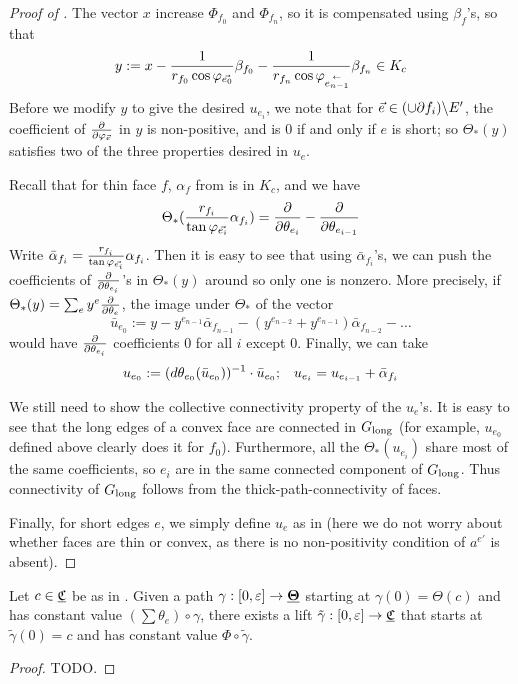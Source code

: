\begin{proof}[Proof of ]
The vector $x$ increase $\Phi_{f_0}$ and $\Phi_{f_n}$, so it is compensated
using $\beta_f$'s, so that
\[
y := x - \frac{1}{r_{f_0} \cos \varphi_{\vec{e_0}}} \beta_{f_0}
- \frac{1}{r_{f_n} \cos \varphi_{\overset{\leftarrow}{e_{n-1}}}} \beta_{f_n}
\in K_c
\]
Before we modify $y$ to give the desired $u_{e_i}$,
we note that for $\vec{e} \in (\cup \partial f_i) \backslash E'$,
the coefficient of ${\frac{\partial}{\partial \varphi_{\vec{e}}}}$ in $y$ is non-positive,
and is 0 if and only if $e$ is short;
so $\Theta_*(y)$ satisfies two of the three properties
desired in $u_e$.


Recall that for thin face $f$,
$\alpha_f$ from  is in $K_c$,
and we have
\[
\Theta_*(\frac{r_{f_i}}{\tan \varphi_{\vec{e_i}}} \alpha_{f_i}) = 
	{\frac{\partial}{\partial \theta_{e_i}}} - {\frac{\partial}{\partial \theta_{e_{i-1}}}}
\]
Write $\bar{\alpha}_{f_i} = \frac{r_{f_i}}{\tan \varphi_{\vec{e_i}}} \alpha_{f_i}$.
Then it is easy to see that using $\bar{\alpha}_{f_i}$'s, we can
push the coefficients of ${\frac{\partial}{\partial \theta_{e_i}}}$'s in $\Theta_*(y)$ around
so only one is nonzero.
More precisely, if
$\Theta_*(y) = \sum_e y^e {\frac{\partial}{\partial \theta_e}}$, the image under $\Theta_*$
of the vector
\[
\bar{u}_{e_0} := y - y^{e_{n-1}} \bar{\alpha}_{f_{n-1}}
- (y^{e_{n-2}} + y^{e_{n-1}}) \bar{\alpha}_{f_{n-2}}
- \ldots
\]
would have ${\frac{\partial}{\partial \theta_{e_i}}}$ coefficients 0 for all $i$ except 0.
Finally, we can take
\[
u_{e_0} := (d\theta_{e_0}(\bar{u}_{e_0}))^{-1} \cdot \bar{u}_{e_0};
\;\;\;
u_{e_i} = u_{e_{i-1}} + \bar{\alpha}_{f_i}
\]

We still need to show the collective connectivity property of the $u_e$'s.
It is easy to see that the long edges of a convex face
are connected in $G_{\text{long}}$
(for example, $u_{e_0}$ defined above clearly does it for
$f_0$).
Furthermore, all the $\Theta_*(u_{e_i})$ share most of the same coefficients,
so $e_i$ are in the same connected component of $G_{\text{long}}$.
Thus connectivity of $G_{\text{long}}$ follows from the
thick-path-connectivity of faces.


Finally, for short edges $e$, we simply define $u_e$
as in 
(here we do not worry about whether faces are thin or convex,
as there is no non-positivity condition of $a^{e'}$ is absent).
\end{proof}


\begin{proposition}
Let $c\in {\underline{\mathfrak{C}}}$ be as in .
Given a path $\gamma: [0,\varepsilon] \to {\underline{\mathbf{\Theta}}}$
starting at $\gamma(0) = \Theta(c)$
and has constant value $(\sum \theta_e) \circ \gamma$,
there exists a lift $\tilde{\gamma} :[0, \varepsilon] \to {\underline{\mathfrak{C}}}$
that starts at $\tilde{\gamma}(0) = c$
and has constant value $\Phi \circ \tilde{\gamma}$.
\end{proposition}


\begin{proof}
TODO.
\end{proof}


